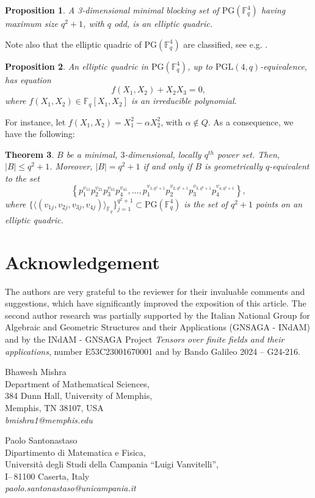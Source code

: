 \documentclass[12pt]{amsart}
\newtheorem{theorem}{Theorem}[section]
\newtheorem{proposition}[theorem]{Proposition}
\newcommand{\F}{{\mathbb F}}
\newcommand{\PG}{\mathrm{PG}}
\begin{document}
\begin{proposition}
A 3-dimensional minimal blocking set of $\PG(\F_{q}^4)$ having maximum size $q^2+1$, with $q$ odd, is an elliptic quadric. 
\end{proposition}

Note also that the elliptic quadric of $\PG(\F_{q}^{4})$ are classified, see e.g. \cite[p. 123]{hirschfeld1998projective}.

\begin{proposition} 
    An elliptic quadric in $\PG(\F_{q}^{4})$, up to $\mathrm{PGL}(4,q)$-equivalence, has equation 
    \[
    f(X_1,X_2)+X_2X_3=0,
    \]
    where $f(X_{1}, X_{2}) \in \F_q[X_{1}, X_{2}]$ is an irreducible polynomial.
\end{proposition}

For instance, let $f(X_{1}, X_{2}) = X_{1}^2-\alpha X_{2}^2$, with $\alpha \notin Q$. As a consequence, we have the following:

\begin{theorem}
$B$ be a minimal, $3$-dimensional, locally $q^{th}$ power set. Then, $\lvert B \rvert \leq q^2+1$. Moreover, $\lvert B \rvert=q^2+1$ if and only if $B$ is geometrically $q$-equivalent to the set
\[
\left\{ p_1^{v_{11}}p_2^{v_{21}}p_3^{v_{31}}p_4^{v_{41}}, \ldots,  p_1^{v_{1,q^2+1}}p_2^{v_{2,q^2+1}}p_3^{v_{3,q^2+1}}p_4^{v_{4,q^2+1}}\right\},
\]
where
$\{\langle (v_{1j},v_{2j},v_{3j},v_{4j}) \rangle_{\F_q}\big\}_{j=1}^{q^{2}+1}\subset\PG(\F_{q}^{4})$ is the set of $q^{2}+1$ points on an elliptic quadric.
\end{theorem}






\section*{Acknowledgement}\footnotesize
The authors are very grateful to the reviewer for their invaluable comments and suggestions, which have significantly improved the exposition of this article. The second author research was partially supported by the Italian National Group for Algebraic and Geometric Structures and their Applications (GNSAGA - INdAM) and by the INdAM - GNSAGA Project \emph{Tensors over finite fields and their applications}, number E53C23001670001 and by Bando Galileo 2024 – G24-216.



%


\medskip

Bhawesh Mishra \\
Department of Mathematical Sciences, \\
384 Dunn Hall, University of Memphis,\\
Memphis, TN 38107, USA \\
{{\em bmishra1@memphis.edu}}


\medskip

Paolo Santonastaso\\
Dipartimento di Matematica e Fisica,\\
Universit\`a degli Studi della Campania ``Luigi Vanvitelli'',\\
I--\,81100 Caserta, Italy\\
{{\em paolo.santonastaso@unicampania.it}}
\end{document}

